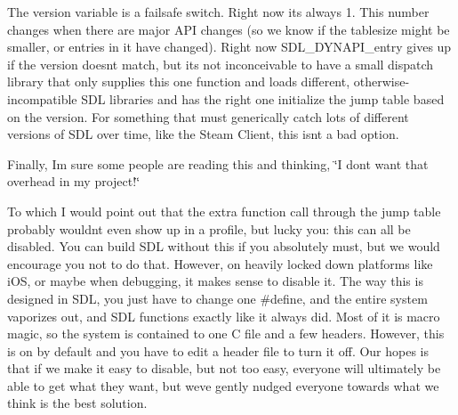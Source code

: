 The version variable is a failsafe switch. Right now it\textquotesingle{}s always 1. This number changes when there are major API changes (so we know if the tablesize might be smaller, or entries in it have changed). Right now SDL\+\_\+\+DYNAPI\+\_\+entry gives up if the version doesn\textquotesingle{}t match, but it\textquotesingle{}s not inconceivable to have a small dispatch library that only supplies this one function and loads different, otherwise-\/incompatible SDL libraries and has the right one initialize the jump table based on the version. For something that must generically catch lots of different versions of SDL over time, like the Steam Client, this isn\textquotesingle{}t a bad option.

Finally, I\textquotesingle{}m sure some people are reading this and thinking, \char`\"{}\+I don\textquotesingle{}t want that overhead in my project!\char`\"{} ~\newline


To which I would point out that the extra function call through the jump table probably wouldn\textquotesingle{}t even show up in a profile, but lucky you\+: this can all be disabled. You can build SDL without this if you absolutely must, but we would encourage you not to do that. However, on heavily locked down platforms like i\+OS, or maybe when debugging, it makes sense to disable it. The way this is designed in SDL, you just have to change one \#define, and the entire system vaporizes out, and SDL functions exactly like it always did. Most of it is macro magic, so the system is contained to one C file and a few headers. However, this is on by default and you have to edit a header file to turn it off. Our hopes is that if we make it easy to disable, but not too easy, everyone will ultimately be able to get what they want, but we\textquotesingle{}ve gently nudged everyone towards what we think is the best solution. 